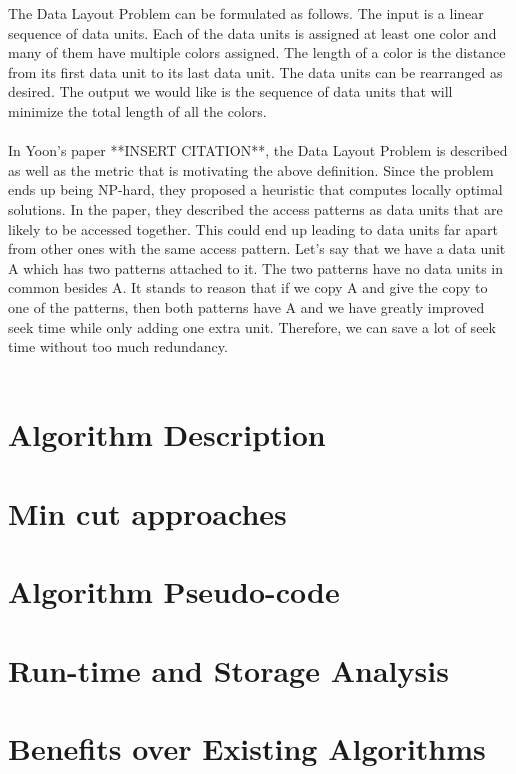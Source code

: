 \documentclass[11pt,psfig]{article}
\begin{document}
The Data Layout Problem can be formulated as follows. The input is a linear sequence of data units. Each of the data units is assigned at least one color and many of them have multiple colors assigned. The length of a color is the distance from its first data unit to its last data unit. The data units can be rearranged as desired. The output we would like is the sequence of data units that will minimize the total length of all the colors. \\
\\
In Yoon's paper **INSERT CITATION**, the Data Layout Problem is described as well as the metric that is motivating the above definition. Since the problem ends up being NP-hard, they proposed a heuristic that computes locally optimal solutions. In the paper, they described the access patterns as data units that are likely to be accessed together. This could end up leading to data units far apart from other ones with the same access pattern. Let's say that we have a data unit A which has two patterns attached to it. The two patterns have no data units in common besides A. It stands to reason that if we copy A and give the copy to one of the patterns, then both patterns have A and we have greatly improved seek time while only adding one extra unit. Therefore, we can save a lot of seek time without too much redundancy. \\
\\

\section*{Algorithm Description}

\section*{Min cut approaches}

\section*{Algorithm Pseudo-code}

\section*{Run-time and Storage Analysis}

\section*{Benefits over Existing Algorithms}
\end{document}

